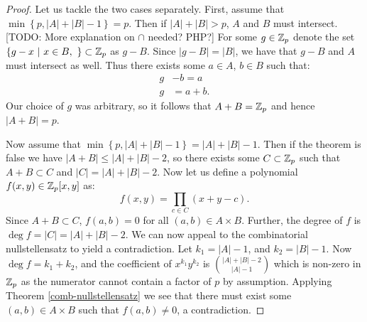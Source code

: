 \begin{proof}
    Let us tackle the two cases separately. First, assume that $\min \left\{p, |A| + |B| -1 \right\} = p$.
    Then if $|A| + |B| > p$, $A$ and $B$ must intersect. [TODO: More explanation on $\cap$ needed? PHP?] 
    For some $g \in \mathbb Z_p$ denote the set  $\left\{ g - x  \ | \ x \in B, \  \right\} \subset \mathbb Z_p$ as $g-B$. Since $|g-B| = |B|$, we have that 
    $g-B$ and $A$ must intersect as well. Thus there exists some $a \in A$, $b \in B$ such that: 
    \begin{align*}
        g& -b = a \\
        g& = a+b.
    \end{align*}
    Our choice of $g$ was arbitrary, so it follows that $A+B = \mathbb Z_p$ and hence $|A+B| = p$.

    Now assume that $\min \left\{p, |A| + |B| -1 \right\} = |A| + |B| -1$. Then if the theorem is false we have $|A+B| \leq |A| + |B| -2$, so there exists some $C \subset \mathbb Z_p$ such that 
    $A+B \subset C$ and $|C| =  |A| + |B| -2$. Now let us define a polynomial $f(x,y) \in \mathbb Z_p [x,y]$ as:
    \[
        f(x,y) = \prod_{c \in C} (x+y -c).
    \]
    Since $A+B \subset C$, $f(a,b) =0$ for all $(a,b) \in A\times B$. Further, the degree of $f$ is $\deg f = |C| = |A| + |B| -2$. 
    We can now appeal to the combinatorial nullstellensatz to yield a contradiction. Let $k_1 = |A| -1$, and $k_2 = |B|-1$. 
    Now $\deg f = k_1 + k_2$, and the coefficient of $x^{k_1}y^{k_2}$ is
    ${|A|+|B| - 2} \choose {|A|- 1}$ which is non-zero in $\mathbb Z_p$ as the numerator cannot contain a factor of $p$ by assumption. Applying Theorem \ref{comb-nullstellensatz} we see that there 
    must exist some $(a,b) \in A \times B$ such that $f(a,b) \neq 0$, a contradiction.
\end{proof}